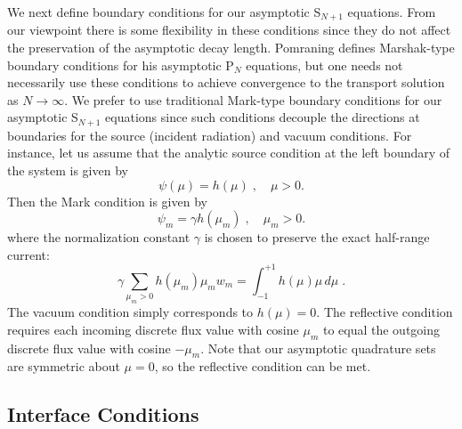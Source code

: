 \documentclass[12pt]{article}
\newcommand{\be}{\begin{equation}}
\newcommand{\ee}{\end{equation}}
\newcommand{\pec}{\; ,}
\newcommand{\pep}{\; .}
\newcommand{\LEQ}[1]{\label{eq:#1}}
\newcommand{\bc}{\begin{center}}
\newcommand{\ec}{\end{center}}
\begin{document}
We next define boundary conditions for our asymptotic S$_{N+1}$ equations.  From our viewpoint there is some flexibility in these 
conditions since they do not affect the preservation of the asymptotic decay length.  Pomraning \cite{pomraning} defines Marshak-type 
boundary conditions for his asymptotic P$_N$ equations, but one needs not necessarily use these conditions to achieve convergence to the 
transport solution as $N \rightarrow \infty$.  We prefer to use traditional Mark-type boundary conditions for our asymptotic 
S$_{N+1}$ equations since such conditions decouple the directions at boundaries for the source (incident radiation) and vacuum conditions. For instance, 
let us assume that the analytic source condition at the left boundary of the system is given by 
\be
\psi(\mu) =  h(\mu) \pec \quad \mu > 0.
\LEQ{55}
\ee
Then the Mark condition is given by 
\be
\psi_m = \gamma h(\mu_m) \pec \quad \mu_m > 0.
\LEQ{56}
\ee
where the normalization constant $\gamma$ is chosen to preserve the exact half-range current:
\be
\gamma \sum_{\mu_m > 0} h(\mu_m) \mu_m w_m =  \int_{-1}^{+1} h(\mu) \mu \, d\mu \pep
\LEQ{57}
\ee
The vacuum condition simply corresponds to $h(\mu) = 0$. The reflective condition requires each 
incoming discrete flux value with cosine $\mu_m$ to equal the outgoing discrete flux value with cosine $-\mu_m$. 
Note that our asymptotic quadrature sets are symmetric about $\mu=0$, so the reflective condition can 
be met.

\subsection{Interface Conditions}
\end{document}
